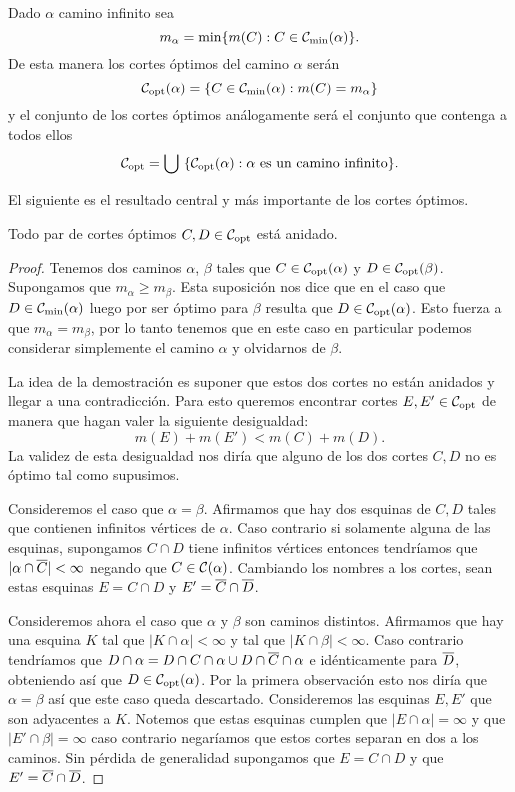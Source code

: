 \documentclass[tesis.tex]{subfiles}
\begin{document}
\begin{deff}
	Dado $\alpha$ camino infinito sea
	\[
		m_\alpha = \min \{ m(C) : C \in {\cal C}_{\text{min}}(\alpha) \}.
	\]
	De esta manera los cortes óptimos del camino $\alpha$ serán
	\[
		{\cal C}_{\text{opt}}(\alpha) = \{ C \in {\cal C}_{\text{min}}(\alpha) : m(C) = m_\alpha  \}
	\]
	y el conjunto de los cortes óptimos análogamente será el conjunto que contenga a todos ellos
	\[
		{\cal C}_{\text{opt}} = \bigcup \ \{ {\cal C}_{\text{opt}}(\alpha) : \alpha \ \text{es un camino infinito}  \}.
	\]
\end{deff}

El siguiente es el resultado central y más importante de los cortes óptimos.

\begin{teo}\label{teo_copt_anidados}
	Todo par de cortes óptimos $C,D \in {\cal C}_{\text{opt}}$ está anidado.
\end{teo}
\begin{proof}
	Tenemos dos caminos $\alpha$, $\beta$ tales que $C \in {\cal C}_{\text{opt}}(\alpha)$ y $D \in {\cal C}_{\text{opt}}(\beta)$.
	Supongamos que $m_{\alpha} \ge m_{\beta}$.
	Esta suposición nos dice que en el caso que $D \in {\cal C}_{\text{min}}(\alpha)$ luego por ser óptimo para $\beta$ resulta que $D \in {\cal C}_{\text{opt}}(\alpha)$.
	Esto fuerza a que $m_{\alpha} = m_{\beta}$, por lo tanto tenemos que en este caso en particular podemos considerar simplemente el camino $\alpha$ y olvidarnos de $\beta$.
	
	La idea de la demostración es suponer que estos dos cortes no están anidados y llegar a una contradicción.
	Para esto queremos encontrar cortes $E, E' \in {\cal C}_{\text{opt}}$ de manera que hagan valer la siguiente desigualdad:
	\[
		m(E) + m(E') < m(C) + m(D).
	\]   
	La validez de esta desigualdad nos diría que alguno de los dos cortes $C,D$ no es óptimo tal como supusimos.
	
	Consideremos el caso que $\alpha = \beta$.
	Afirmamos que hay dos esquinas de $C,D$ tales que contienen infinitos vértices de $\alpha$.
	Caso contrario si solamente alguna de las esquinas, supongamos $C \cap D$ tiene infinitos vértices entonces tendríamos que $|\alpha \cap \overline C| < \infty$ negando que $C \in {\cal C}(\alpha)$.
	Cambiando los nombres a los cortes, sean estas esquinas $E = C \cap D$ y $E' = \overline C \cap \overline D$.
	
	Consideremos ahora el caso que $\alpha$ y $\beta$ son caminos distintos.
	Afirmamos que hay una esquina $K$ tal que $|K \cap \alpha| < \infty$ y tal que $|K \cap \beta| < \infty$.
	Caso contrario tendríamos que $D \cap \alpha = D \cap C \cap \alpha  \cup D \cap \overline C \cap \alpha$ e idénticamente para $\overline D$, obteniendo así que $D \in {\cal C}_{\text{opt}}(\alpha)$.
	Por la primera observación esto nos diría que $\alpha = \beta$ así que este caso queda descartado.
	Consideremos las esquinas $E,E'$ que son adyacentes a $K$.
	Notemos que estas esquinas cumplen que $|E \cap \alpha| = \infty$ y que $|E' \cap \beta| = \infty$ caso contrario negaríamos que estos cortes separan en dos a los caminos.
	Sin pérdida de generalidad supongamos que $E = C \cap D$ y que $E' = \overline C \cap \overline D$.
	

\end{proof}
\end{document}
